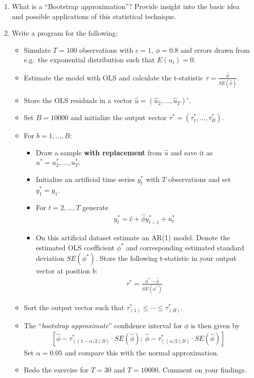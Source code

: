\begin{enumerate}
	\item What is a \enquote{Bootstrap approximation}? Provide insight into the basic idea and possible applications of this statistical technique.
	\item Write a program for the following:
	\begin{itemize}
		\item Simulate \(T=100\) observations with \(c=1\), \(\phi=0.8\)
          and errors drawn from e.g.\ the exponential distribution such that \(E(u_t)=0\).
		\item Estimate the model with OLS and calculate the t-statistic
        \(\tau=\frac{\hat{\phi}}{SE(\hat{\phi})}\). 
		\item Store the OLS residuals in a vector
        \(\hat{u} = (\hat{u}_{2},\ldots ,\hat{u}_{T})'\).
		\item Set \(B=10000\) and initialize the output vector
        \(\tau^{\ast} = (\tau_1^\ast,\ldots,\tau_B^\ast)\).
        \item For \( b=1,\ldots,B \):
		\begin{itemize}
			\item Draw a sample \textbf{with replacement} from \(\hat{u}\)
              and save it as \(u^{\ast} = u_{2}^{\ast},\ldots ,u_{T}^{\ast }\).
			\item Initialize an artificial time series \( y_t^\ast \) with \(T\) observations
              and set \(y_1^\ast = y_1\).
			\item For \(t=2,\ldots ,T\) generate
			\begin{align*}
			y_{t}^{\ast }=\hat{c}+\hat{\phi}y^\ast_{t-1}+u_{t}^{\ast }
			\end{align*}
			\item On this artificial dataset estimate an AR(1) model.
            Denote the estimated OLS coefficient \(\phi^\ast\)
              and corresponding estimated standard deviation \(SE(\phi^\ast)\).
            Store the following t-statistic in your output vector at position \(b\):
            \begin{align*}
            \tau^\ast = \frac{\phi^\ast - \hat{\phi}}{SE(\phi^\ast)}
            \end{align*}
		\end{itemize}
		\item Sort the output vector such that \(\tau_{(1)}^\ast \leq \cdots \leq \tau_{(B)}^\ast\).
		\item  The \enquote{\emph{bootstrap approximate}} confidence interval for \(\phi\) is then given by
		\begin{align*}
		\left[ \hat{\phi}-\tau_{((1-\alpha /2)B)}^{\ast }\cdot SE(\hat{\phi});\ \hat{\phi}-\tau_{((\alpha/2)B)}^{\ast }\cdot SE(\hat{\phi})\right] 
		\end{align*}
		Set \(\alpha=0.05\) and compare this with the normal approximation.
		\item Redo the exercise for \(T=30\) and \(T=10000\). Comment on your findings.
	\end{itemize}
\end{enumerate}

